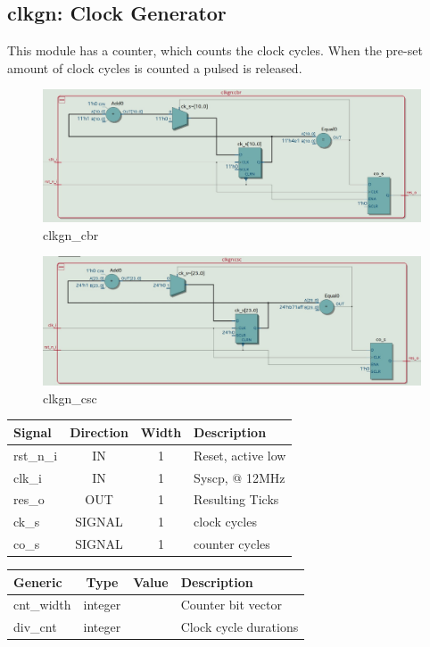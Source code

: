 \documentclass[12pt,a4 paper] {report}
\begin{document}
\subsection{clkgn: Clock Generator}
This module has a counter, which counts the clock cycles. When the pre-set amount of clock cycles is counted a pulsed 
is released.
\begin{figure}[h]
	\centering	
	\includegraphics[scale=0.2]{../png/clkgn_cbr.png}
	\caption{clkgn\_cbr}
\end{figure}
\begin{figure}[h]
	\centering	
	\includegraphics[scale=0.2]{../png/clkgn_csc.png}
	\caption{clkgn\_csc}
\end{figure}
\begin{center}
	\begin{tabular}{ | p{2cm} | c | c | p{5cm} |}
		\hline
		\textbf{Signal} & \textbf{Direction} & \textbf{Width} & \textbf{Description} \\
		\hline
		\hline
  	rst\_n\_i & IN & 1 & Reset, active low \\
  	\hline
		clk\_i & IN & 1 & Syscp, @ 12MHz \\
		\hline
		res\_o & OUT & 1 & Resulting Ticks \\
		\hline
		\hline
		ck\_s & SIGNAL & 1 & clock cycles\\
		\hline
		co\_s & SIGNAL & 1 & counter cycles \\
		\hline
	\end{tabular}
\end{center}
\begin{center}
	\begin{tabular}{| p{2cm} | c | c | p{5cm} |}
	\hline
	\textbf{Generic} & \textbf{Type} & \textbf{Value} & \textbf{Description} \\
	\hline
	cnt\_width & integer &  & Counter bit vector \\
	\hline
	div\_cnt & integer &  & Clock cycle durations \\	
	\hline
	\end{tabular}
\end{center}
\end{document}
